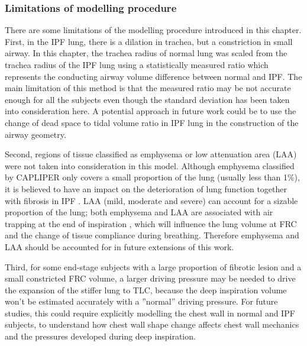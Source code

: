 \subsubsection{Limitations of modelling procedure}
There are some limitations of the modelling procedure introduced in this chapter. First, in the IPF lung, there is a dilation in trachea, but a constriction in small airway. In this chapter, the trachea radius of normal lung was scaled from the trachea radius of the IPF lung using a statistically measured ratio which represents the conducting airway volume difference between normal and IPF. The main limitation of this method is that the measured ratio may be not accurate enough for all the subjects even though the standard deviation has been taken into consideration here. A potential approach in future work could be to use the change of dead space to tidal volume ratio in IPF lung in the construction of the airway geometry. 

Second, regions of tissue classified as emphysema or low attenuation area (LAA) were not taken into consideration in this model. Although emphysema classified by CAPLIPER only covers a small proportion of the lung (usually less than 1\%), it is believed to have an impact on the deterioration of lung function together with fibrosis in IPF \citep{cottin2005combined, king2011idiopathic, lin2015combined}. LAA (mild, moderate and severe) can account for a sizable proportion of the lung; both emphysema and LAA are associated with air trapping at the end of inspiration \citep{slebos2015air, hoesein2017air}, which will influence the lung volume at FRC and the change of tissue compliance during breathing. Therefore emphysema and LAA should be accounted for in future extensions of this work.

Third, for some end-stage subjects with a large proportion of fibrotic lesion and a small constricted FRC volume, a larger driving pressure may be needed to drive the expansion of the stiffer lung to TLC, because the deep inspiration volume won't be estimated accurately with a ''normal'' driving pressure. For future studies, this could require explicitly modelling the chest wall in normal and IPF subjects, to understand how chest wall shape change affects chest wall mechanics and the pressures developed during deep inspiration.


